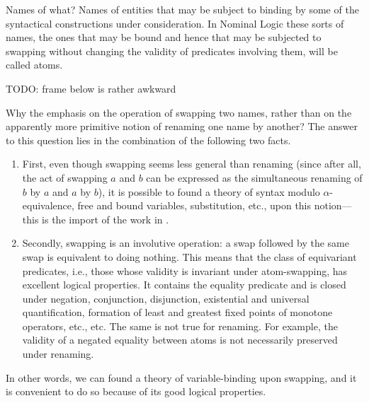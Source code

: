 \documentclass[english, mgr]{iithesis}
\begin{document}
\begin{mdframed}[frametitle={Pitts, 2003\cite{pitts2003}}]
Names of what? Names of entities that may be subject to binding by some of
the syntactical constructions under consideration. In Nominal Logic these sorts of
names, the ones that may be bound and hence that may be subjected to swapping
without changing the validity of predicates involving them, will be called atoms.
\end{mdframed}
TODO: frame below is rather awkward
\begin{mdframed}[frametitle={Pitts, 2003\cite{pitts2003}}]
Why the emphasis on the operation of swapping two names, rather than on the
apparently more primitive notion of renaming one name by another? The answer
to this question lies in the combination of the following two facts.

\begin{enumerate}
  \item First, even though swapping seems less general than renaming (since after all,
  the act of swapping \(a\) and \(b\) can be expressed as the simultaneous renaming
  of \(b\) by \(a\) and \(a\) by \(b\)), it is possible to found a theory of syntax modulo
  \(\alpha\)-equivalence, free and bound variables, substitution, etc., upon this notion—
  this is the import of the work in \cite{subnbinders}.
  \item Secondly, swapping is an involutive operation: a swap followed by the same
  swap is equivalent to doing nothing. This means that the class of equivariant
  predicates, i.e., those whose validity is invariant under atom-swapping, has
  excellent logical properties. It contains the equality predicate and is closed
  under negation, conjunction, disjunction, existential and universal quantification,
  formation of least and greatest fixed points of monotone operators, etc., etc.
  The same is not true for renaming. For example, the validity of a
  negated equality between atoms is not necessarily preserved under renaming.
\end{enumerate}

In other words, we can found a theory of variable-binding upon swapping, and it
is convenient to do so because of its good logical properties.
\end{mdframed}
\end{document}
